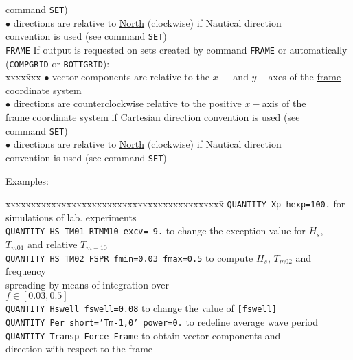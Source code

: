 \documentclass[12pt]{book}
\begin{document}
\begin{tabbing}
                                     command {\tt SET})\-\\
                      {$\bullet$} \> directions  are relative to \underline{North} (clockwise) if Nautical direction\+\\
                                     convention is used (see command {\tt SET})\-\-\\
                      \poptabs
{\tt FRAME}        \> If output is requested on sets created by command {\tt FRAME} or automatically\+\\
                      ({\tt COMPGRID} or {\tt BOTTGRID}):\\
                      \pushtabs
                      xxxx\=xxx \kill
                      {$\bullet$} \> vector components are relative to the $x-$ and $y-$axes of the \underline{frame}\+\\
                                     coordinate system\-\\
                      {$\bullet$} \> directions are counterclockwise relative to the positive $x-$axis of the\+\\
                                     \underline{frame} coordinate system if Cartesian direction convention is used (see\\
                                      command {\tt SET})\-\\
                      {$\bullet$} \> directions  are relative to \underline{North} (clockwise) if Nautical direction\+\\
                                     convention is used (see command {\tt SET})\-\-\\
                      \poptabs
\end{tabbing}

\noindent
Examples:
\begin{tabbing}
 xxxxxxxxxxxxxxxxxxxxxxxxxxxxxxxxxxxxxxxxxxx\= \kill
{\tt QUANTITY Xp hexp=100.}                    \> for simulations of lab. experiments\\
{\tt QUANTITY HS TM01 RTMM10 excv=-9.}         \> to change the exception value for $H_s$,\+\\
                                                  $T_{m01}$ and relative $T_{m-10}$\-\\
{\tt QUANTITY HS TM02 FSPR fmin=0.03 fmax=0.5} \> to compute $H_s$, $T_{m02}$ and frequency\+\\
                                                  spreading by means of integration over\\
                                                  $f \in [0.03, 0.5]$\-\\
{\tt QUANTITY Hswell fswell=0.08}              \> to change the value of {\tt [fswell]}\\
{\tt QUANTITY Per short='Tm-1,0'  power=0.}    \> to redefine average wave period\\
{\tt QUANTITY Transp Force Frame}              \> to obtain vector components and\+\\
                                                  direction with respect to the frame\-\\
\end{tabbing}
\end{document}
